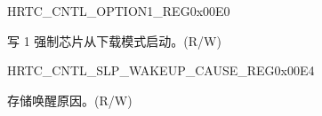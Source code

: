 \begin{register}{H}{RTC\_CNTL\_OPTION1\_REG}{0x00E0}\label{regdesc:RTCCNTLOPTION1REG}
%
%
\regnewline%
\begin{regdesc}\begin{reglist}
\label{fielddesc:RTCCNTLFORCEDOWNLOADBOOT}\item [RTC\_CNTL\_FORCE\_DOWNLOAD\_BOOT] 写 1 强制芯片从下载模式启动。(R/W)
\end{reglist}\end{regdesc}
\end{register}


\begin{register}{H}{RTC\_CNTL\_SLP\_WAKEUP\_CAUSE\_REG}{0x00E4}\label{regdesc:RTCCNTLSLPWAKEUPCAUSEREG}
%
%
\regnewline%
\begin{regdesc}\begin{reglist}
\label{fielddesc:RTCCNTLWAKEUPCAUSE}\item [RTC\_CNTL\_WAKEUP\_CAUSE] 存储唤醒原因。(R/W)
\end{reglist}\end{regdesc}
\end{register}


